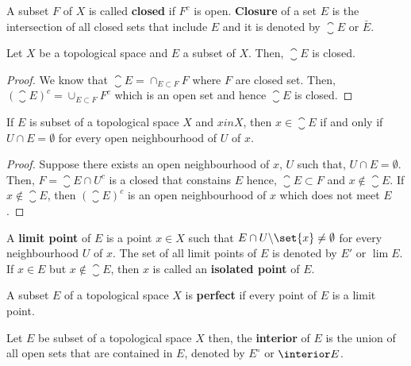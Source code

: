\begin{definition}
    A subset \(F\) of \(X\) is called \textbf{closed} if \(F^c\) is open. \textbf{Closure} of a set \(E\) is the intersection of all closed sets that include \(E\) and it is denoted by \(\closure E\) or \(\bar{E}\). 
\end{definition}

\begin{proposition}
    Let \(X\) be a topological space and \(E\) a subset of \(X\). Then, \(\closure E\) is closed.
\end{proposition}

\begin{proof}
    We know that \(\closure E = \cap_{E \subset F} F\) where \(F\) are closed set. Then, \((\closure E)^c = \cup_{E \subset F} F^c\) which is an open set and hence \(\closure E\) is closed.
\end{proof}

\begin{proposition}
    If \(E\) is subset of a topological space \(X\) and \(x in X\), then \(x \in \closure E\) if and only if \(U \cap E = \emptyset\) for every open neighbourhood of \(U\) of \(x\).
\end{proposition}

\begin{proof}
    Suppose there exists an open neighbourhood of \(x\), \(U\) such that, \(U \cap E = \emptyset\). Then, \(F = \closure E \cap U^c\) is a closed that constains \(E\) hence, \(\closure E \subset F\) and \(x \notin \closure E\). If \(x \notin \closure E\), then \((\closure E)^c\) is an open neighbourhood of \(x\) which does not meet \(E\).
\end{proof}

\begin{definition}
    A \textbf{limit point} of \(E\) is a point \(x \in X\) such that \(E \cap U \backslash \set{x} \neq \emptyset\) for every neighbourhood \(U\) of \(x\). The set of all limit points of \(E\) is denoted by \(E'\) or \(\lim E\). If \(x \in E\) but \(x \notin \closure E\), then \(x\) is called an \textbf{isolated point} of \(E\).
\end{definition}

\begin{definition}
    A subset \(E\) of a topological space \(X\) is \textbf{perfect} if every point of \(E\) is a limit point.
\end{definition}

\begin{definition}
    Let \(E\) be subset of a topological space \(X\) then, the \textbf{interior} of \(E\) is the union of all open sets that are contained in \(E\), denoted by \(E^{\circ}\) or \(\interior E\).
\end{definition}

